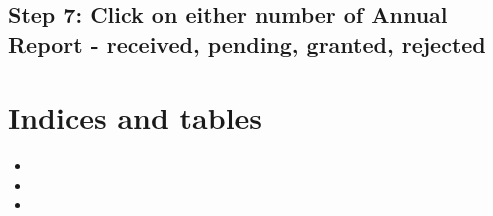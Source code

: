 \documentclass[letterpaper,10pt,english]{sphinxmanual}
\begin{document}
\noindent{}


\section{Step 7: Click on either number of Annual Report - received, pending, granted, rejected}
\label{\detokenize{MIS Annual Report Procedure:step-7-click-on-either-number-of-annual-report-received-pending-granted-rejected}}
\noindent{}


\chapter{Indices and tables}
\label{\detokenize{index:indices-and-tables}}\begin{itemize}
\item {} 

\item {} 

\item {} 

\end{itemize}



\renewcommand{\indexname}{Index}
\printindex
\end{document}
